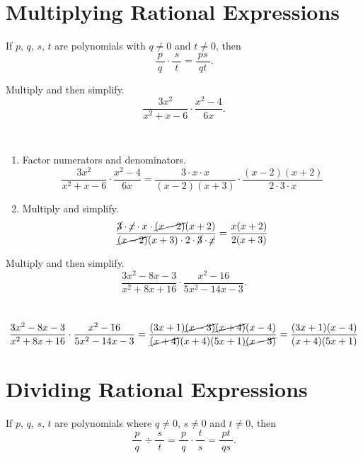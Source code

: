 \documentclass[en,11pt]{elegantbook}
\let\BeginKnitrBlock\begin \let\EndKnitrBlock\end
\begin{document}
\hypertarget{multiplying-rational-expressions}{%
\section{Multiplying Rational Expressions}\label{multiplying-rational-expressions}}

If \(p\), \(q\), \(s\), \(t\) are polynomials with \(q\neq 0\) and \(t\neq 0\), then
\[
\dfrac{~p~}{~q~}\cdot\dfrac{~s~}{~t~}=\dfrac{~ps~}{~qt~}.
\]

\BeginKnitrBlock{example}
\protect\hypertarget{exm:unnamed-chunk-36}{}{\label{exm:unnamed-chunk-36} }
Multiply and then simplify.
\[\dfrac{3x^2}{x^2+x-6}\cdot\dfrac{x^2-4}{6x}.\]
\EndKnitrBlock{example}

\BeginKnitrBlock{solution}
{}\\

\begin{enumerate}
\def\labelenumi{\arabic{enumi}.}
\item
  Factor numerators and denominators.
  \[
   \dfrac{3x^2}{x^2+x-6}\cdot\dfrac{x^2-4}{6x}=\dfrac{3\cdot x\cdot x}{(x-2)(x+3)}\cdot\dfrac{(x-2)(x+2)}{2\cdot3\cdot x}
  \]
\item
  Multiply and simplify.
  \[
   \dfrac{\cancel{3}\cdot \cancel{x}\cdot x\cdot\cancel{(x-2)}(x+2)}{\cancel{(x-2)}(x+3)\cdot 2\cdot\cancel{3}\cdot \cancel{x}}=\dfrac{x(x+2)}{2(x+3)}
  \]
\end{enumerate}
\EndKnitrBlock{solution}

\BeginKnitrBlock{example}
\protect\hypertarget{exm:unnamed-chunk-38}{}{\label{exm:unnamed-chunk-38} }
Multiply and then simplify.
\[
\dfrac{3x^2-8x-3}{x^2+8x+16}\cdot\dfrac{x^2-16}{5x^2-14x-3}.
\]
\EndKnitrBlock{example}

\BeginKnitrBlock{solution}
{}\\

\[
\dfrac{3x^2-8x-3}{x^2+8x+16}\cdot\dfrac{x^2-16}{5x^2-14x-3}
=\dfrac{(3x+1)\cancel{(x-3)}\cancel{(x+4)}(x-4)}{\cancel{(x+4)}(x+4)(5x+1)\cancel{(x-3)}}
=\dfrac{(3x+1)(x-4)}{(x+4)(5x+1)}
\]
\EndKnitrBlock{solution}

\hypertarget{dividing-rational-expressions}{%
\section{Dividing Rational Expressions}\label{dividing-rational-expressions}}

If \(p\), \(q\), \(s\), \(t\) are polynomials where \(q\neq 0\), \(s\neq 0\) and \(t\neq 0\), then
\[
\dfrac{~p~}{~q~}\div\dfrac{~s~}{~t~}=\dfrac{~p~}{~q~}\cdot\dfrac{~t~}{~s~}=\dfrac{~pt~}{~qs~}.
\]
\end{document}
